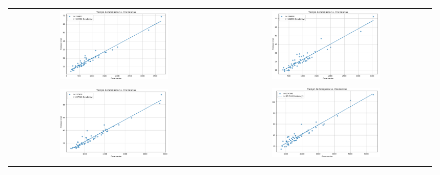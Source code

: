 \begin{figure}[]
\begin{tabular}{cc}
        \includegraphics[width=0.55\textwidth]{imagenes/Figure_154452.png} & \includegraphics[width=0.55\textwidth]{imagenes/Figure_186998.png} \\
        \includegraphics[width=0.55\textwidth]{imagenes/Figure_237418.png} & \includegraphics[width=0.55\textwidth]{imagenes/Figure_274500.png} \\
    \end{tabular}    
    \label{tab:searches}
\end{figure}

